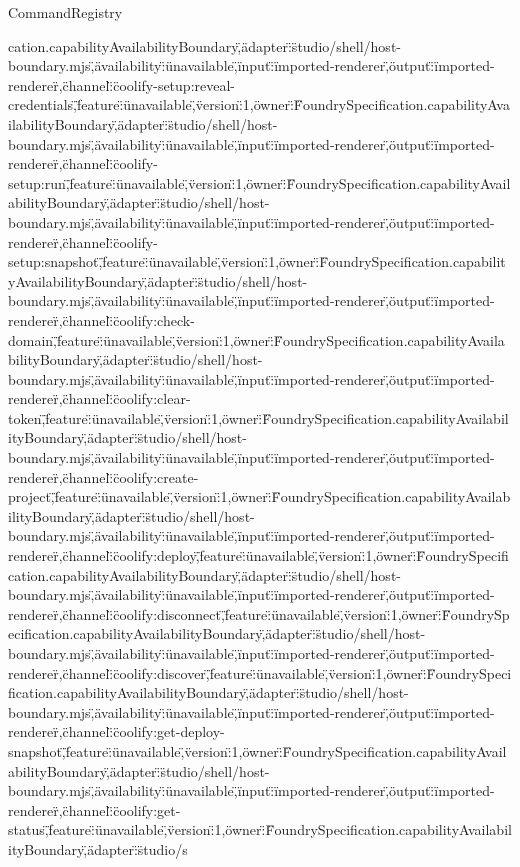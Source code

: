 \begin{lexlean}{CommandRegistry}
\begin{semanticmodule}
{cation.capabilityAvailabilityBoundary\",\"adapter\":\"studio/shell/host-boundary.mjs\",\"availability\":\"unavailable\",\"input\":\"imported-renderer\",\"output\":\"imported-renderer\"},{\"channel\":\"coolify-setup:reveal-credentials\",\"feature\":\"unavailable\",\"version\":1,\"owner\":\"FoundrySpecification.capabilityAvailabilityBoundary\",\"adapter\":\"studio/shell/host-boundary.mjs\",\"availability\":\"unavailable\",\"input\":\"imported-renderer\",\"output\":\"imported-renderer\"},{\"channel\":\"coolify-setup:run\",\"feature\":\"unavailable\",\"version\":1,\"owner\":\"FoundrySpecification.capabilityAvailabilityBoundary\",\"adapter\":\"studio/shell/host-boundary.mjs\",\"availability\":\"unavailable\",\"input\":\"imported-renderer\",\"output\":\"imported-renderer\"},{\"channel\":\"coolify-setup:snapshot\",\"feature\":\"unavailable\",\"version\":1,\"owner\":\"FoundrySpecification.capabilityAvailabilityBoundary\",\"adapter\":\"studio/shell/host-boundary.mjs\",\"availability\":\"unavailable\",\"input\":\"imported-renderer\",\"output\":\"imported-renderer\"},{\"channel\":\"coolify:check-domain\",\"feature\":\"unavailable\",\"version\":1,\"owner\":\"FoundrySpecification.capabilityAvailabilityBoundary\",\"adapter\":\"studio/shell/host-boundary.mjs\",\"availability\":\"unavailable\",\"input\":\"imported-renderer\",\"output\":\"imported-renderer\"},{\"channel\":\"coolify:clear-token\",\"feature\":\"unavailable\",\"version\":1,\"owner\":\"FoundrySpecification.capabilityAvailabilityBoundary\",\"adapter\":\"studio/shell/host-boundary.mjs\",\"availability\":\"unavailable\",\"input\":\"imported-renderer\",\"output\":\"imported-renderer\"},{\"channel\":\"coolify:create-project\",\"feature\":\"unavailable\",\"version\":1,\"owner\":\"FoundrySpecification.capabilityAvailabilityBoundary\",\"adapter\":\"studio/shell/host-boundary.mjs\",\"availability\":\"unavailable\",\"input\":\"imported-renderer\",\"output\":\"imported-renderer\"},{\"channel\":\"coolify:deploy\",\"feature\":\"unavailable\",\"version\":1,\"owner\":\"FoundrySpecification.capabilityAvailabilityBoundary\",\"adapter\":\"studio/shell/host-boundary.mjs\",\"availability\":\"unavailable\",\"input\":\"imported-renderer\",\"output\":\"imported-renderer\"},{\"channel\":\"coolify:disconnect\",\"feature\":\"unavailable\",\"version\":1,\"owner\":\"FoundrySpecification.capabilityAvailabilityBoundary\",\"adapter\":\"studio/shell/host-boundary.mjs\",\"availability\":\"unavailable\",\"input\":\"imported-renderer\",\"output\":\"imported-renderer\"},{\"channel\":\"coolify:discover\",\"feature\":\"unavailable\",\"version\":1,\"owner\":\"FoundrySpecification.capabilityAvailabilityBoundary\",\"adapter\":\"studio/shell/host-boundary.mjs\",\"availability\":\"unavailable\",\"input\":\"imported-renderer\",\"output\":\"imported-renderer\"},{\"channel\":\"coolify:get-deploy-snapshot\",\"feature\":\"unavailable\",\"version\":1,\"owner\":\"FoundrySpecification.capabilityAvailabilityBoundary\",\"adapter\":\"studio/shell/host-boundary.mjs\",\"availability\":\"unavailable\",\"input\":\"imported-renderer\",\"output\":\"imported-renderer\"},{\"channel\":\"coolify:get-status\",\"feature\":\"unavailable\",\"version\":1,\"owner\":\"FoundrySpecification.capabilityAvailabilityBoundary\",\"adapter\":\"studio/s}
\end{semanticmodule}
\end{lexlean}
